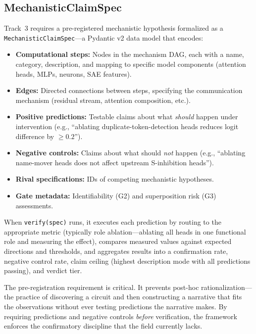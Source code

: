 \documentclass[10pt]{article}
\newcommand{\eg}{e.g.}
\begin{document}
\subsection{MechanisticClaimSpec}
\label{sec:claimspec}

Track~3 requires a pre-registered mechanistic hypothesis formalized as a \texttt{MechanisticClaimSpec}---a Pydantic v2 data model that encodes:

\begin{itemize}[nosep]
    \item \textbf{Computational steps:} Nodes in the mechanism DAG, each with a name, category, description, and mapping to specific model components (attention heads, MLPs, neurons, SAE features).
    \item \textbf{Edges:} Directed connections between steps, specifying the communication mechanism (residual stream, attention composition, etc.).
    \item \textbf{Positive predictions:} Testable claims about what \emph{should} happen under intervention (\eg, ``ablating duplicate-token-detection heads reduces logit difference by $\geq 0.2$'').
    \item \textbf{Negative controls:} Claims about what should \emph{not} happen (\eg, ``ablating name-mover heads does not affect upstream S-inhibition heads'').
    \item \textbf{Rival specifications:} IDs of competing mechanistic hypotheses.
    \item \textbf{Gate metadata:} Identifiability (G2) and superposition risk (G3) assessments.
\end{itemize}

When \texttt{verify(spec)} runs, it executes each prediction by routing to the appropriate metric (typically role ablation---ablating all heads in one functional role and measuring the effect), compares measured values against expected directions and thresholds, and aggregates results into a confirmation rate, negative control rate, claim ceiling (highest description mode with all predictions passing), and verdict tier.

The pre-registration requirement is critical. It prevents post-hoc rationalization---the practice of discovering a circuit and then constructing a narrative that fits the observations without ever testing predictions the narrative makes. By requiring predictions and negative controls \emph{before} verification, the framework enforces the confirmatory discipline that the field currently lacks.
\end{document}
